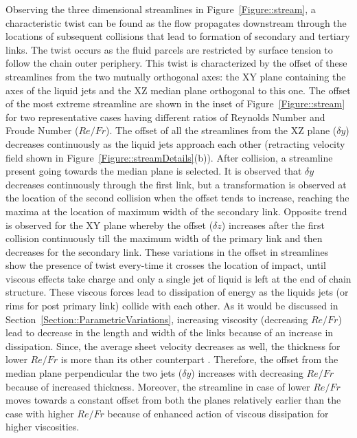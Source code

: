 \documentclass[%
aip,
sd,%
amsmath,amssymb,
preprint,%
author-year,%
]{revtex4-1}
\begin{document}
Observing the three dimensional streamlines in Figure~\ref{Figure::stream}, a characteristic twist can be found as the flow propagates downstream through the locations of subsequent collisions that lead to formation of secondary and tertiary links. The twist occurs as the fluid parcels are restricted by surface tension to follow the chain outer periphery. This twist is characterized by the offset of these streamlines from the two mutually orthogonal axes: the XY plane containing the axes of the liquid jets and the XZ median plane orthogonal to this one. The offset of the most extreme streamline are shown in the inset of Figure~\ref{Figure::stream} for two representative cases having different ratios of Reynolds Number and Froude Number ($Re/Fr$). The offset of all the streamlines from the XZ plane ($\delta y$) decreases continuously as the liquid jets approach each other (retracting velocity field shown in Figure~\ref{Figure::streamDetails}(b)). After collision, a streamline present going towards the median plane is selected. It is observed that $\delta y$ decreases continuously through the first link, but a transformation is observed at the location of the second collision when the offset tends to increase, reaching the maxima at the location of maximum width of the secondary link. Opposite trend is observed for the XY plane whereby the offset ($\delta z$) increases after the first collision continuously till the maximum width of the primary link and then decreases for the secondary link. These variations in the offset in streamlines show the presence of twist every-time it crosses the location of impact, until viscous effects take charge and only a single jet of liquid is left at the end of chain structure. These viscous forces lead to dissipation of energy as the liquids jets (or rims for post primary link) collide with each other. 
As it would be discussed in Section~\ref{Section::ParametricVariations}, increasing viscosity (decreasing $Re/Fr$) lead to decrease in the length and width of the links because of an increase in dissipation. Since, the average sheet velocity decreases as well, the thickness for lower $Re/Fr$ is more than its other counterpart \citep{yang2014liquid}. Therefore, the offset from the median plane perpendicular the two jets ($\delta y$) increases with decreasing $Re/Fr$ because of increased thickness. Moreover, the streamline in case of lower $Re/Fr$ moves towards a constant offset from both the planes relatively earlier than the case with higher $Re/Fr$ because of enhanced action of viscous dissipation for higher viscosities.
\end{document}
